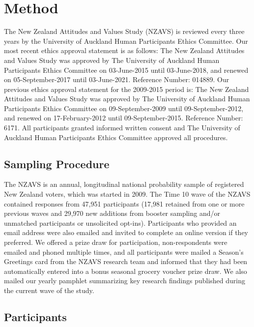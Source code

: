 \documentclass[
  english,
  man]{apa6}
\begin{document}
\hypertarget{method}{%
\section{Method}\label{method}}

The New Zealand Attitudes and Values Study (NZAVS) is reviewed every three years by the University of Auckland Human Participants Ethics Committee. Our most recent ethics approval statement is as follows: The New Zealand Attitudes and Values Study was approved by The University of Auckland Human Participants Ethics Committee on 03-June-2015 until 03-June-2018, and renewed on 05-September-2017 until 03-June-2021. Reference Number: 014889. Our previous ethics approval statement for the 2009-2015 period is: The New Zealand Attitudes and Values Study was approved by The University of Auckland Human Participants Ethics Committee on 09-September-2009 until 09-September-2012, and renewed on 17-February-2012 until 09-September-2015. Reference Number: 6171. All participants granted informed written consent and The University of Auckland Human Participants Ethics Committee approved all procedures.

\hypertarget{sampling-procedure}{%
\subsection{Sampling Procedure}\label{sampling-procedure}}

The NZAVS is an annual, longitudinal national probability sample of registered New Zealand voters, which was started in 2009. The Time 10 wave of the NZAVS contained responses from 47,951 participants (17,981 retained from one or more previous waves and 29,970 new additions from booster sampling and/or unmatched participants or unsolicited opt-ins). Participants who provided an email address were also emailed and invited to complete an online version if they preferred. We offered a prize draw for participation, non-respondents were emailed and phoned multiple times, and all participants were mailed a Season's Greetings card from the NZAVS research team and informed that they had been automatically entered into a bonus seasonal grocery voucher prize draw. We also mailed our yearly pamphlet summarizing key research findings published during the current wave of the study.

\hypertarget{participants}{%
\subsection{Participants}\label{participants}}
\end{document}
